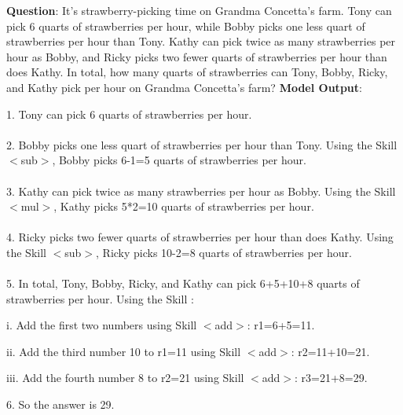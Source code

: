 \documentclass{article} %
\begin{document}
\begin{tcolorbox}[title = {GSM8K}, colback = Apricot!25!white, colframe = BrickRed!75!black] 
\textbf{Question}: It's strawberry-picking time on Grandma Concetta's farm.  Tony can pick 6 quarts of strawberries per hour, while Bobby picks one less quart of strawberries per hour than Tony.  Kathy can pick twice as many strawberries per hour as Bobby, and Ricky picks two fewer quarts of strawberries per hour than does Kathy.  In total, how many quarts of strawberries can Tony, Bobby, Ricky, and Kathy pick per hour on  Grandma Concetta's farm? 
\tcblower
\textbf{Model Output}:



1. Tony can pick 6 quarts of strawberries per hour. \\ \\
2. Bobby picks one less quart of strawberries per hour than Tony. Using the Skill $<$sub$>$, Bobby picks 6-1=5 quarts of strawberries per hour. \\ \\
3. Kathy can pick twice as many strawberries per hour as Bobby. Using the Skill $<$mul$>$, Kathy picks 5*2=10 quarts of strawberries per hour. \\ \\
4. Ricky picks two fewer quarts of strawberries per hour than does Kathy.  Using the Skill $<$sub$>$, Ricky picks 10-2=8 quarts of strawberries per hour. \\ \\
5. In total, Tony, Bobby, Ricky, and Kathy can pick 6+5+10+8 quarts of strawberries per hour. Using the Skill : 

\quad

   \qquad i. Add the first two numbers using Skill $<$add$>$: r1=6+5=11. 
   
     \qquad ii. Add the third number 10 to r1=11 using Skill $<$add$>$: r2=11+10=21. 
     
    \qquad  iii. Add the fourth number 8 to r2=21 using Skill $<$add$>$: r3=21+8=29. 

\quad
    
6. So the answer is 29. 
\end{tcolorbox}
\noindent\begin{minipage}{\textwidth}
 \label{Tab:example_compose_gsm8k_skill_1}
\end{minipage}
\end{document}
